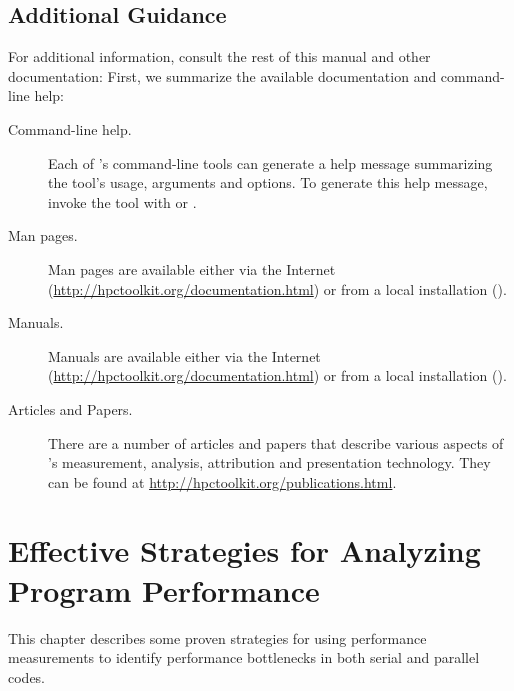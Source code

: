 \documentclass[11pt,twoside,letterpaper]{report}
\begin{document}
\section{Additional Guidance}

For additional information, consult the rest of this manual and other documentation:
First, we summarize the available documentation and command-line help:

\begin{description}

\item[Command-line help.]\hfill

Each of \HPCToolkit{}'s command-line tools can generate a help message summarizing the tool's usage, arguments and options.
To generate this help message, invoke the tool with  or .

\item[Man pages.]\hfill

Man pages are available either via the Internet (\url{http://hpctoolkit.org/documentation.html}) or from a local \HPCToolkit{} installation ().

\item[Manuals.]\hfill

Manuals are available either via the Internet (\url{http://hpctoolkit.org/documentation.html}) or from a local \HPCToolkit{} installation ().

\item[Articles and Papers.]\hfill

There are a number of articles and papers that describe various aspects of \HPCToolkit{}'s measurement, analysis, attribution and presentation technology.
They can be found at \url{http://hpctoolkit.org/publications.html}.

\end{description}



\cleardoublepage
\chapter{Effective Strategies for Analyzing Program Performance}
\label{chpt:effective-performance-analysis}

This chapter describes some proven strategies for using performance measurements to identify performance bottlenecks in both serial and parallel codes.
\end{document}
